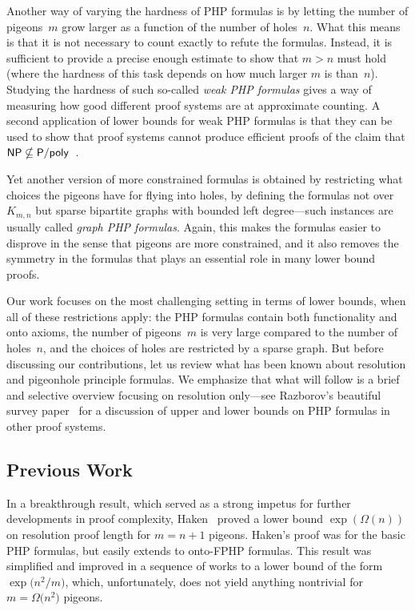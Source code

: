 \documentclass{article}
\newcommand{\Bigomega}[1]{\Omega \bigl( #1 \bigr)}
\newcommand{\bigomega}[1]{\Omega ( #1 )}
\newcommand{\complclassformat}[1]{\textrm{\upshape{\textsf{#1}}}\xspace}
\newcommand{\NP}{\complclassformat{NP}}
\newcommand{\Ppoly}{\complclassformat{P/poly}}
\newcommand{\introduceterm}[1]{{\emph{#1}}}
\newcommand{\squeezesubsection}[1]{\subsection{#1}}
\numberwithin{equation}{section}
\begin{document}
Another way of varying the hardness of PHP formulas is  by letting the
number of pigeons~$m$ grow larger as a function of the number of
holes~$n$.  
What this means is that it is not necessary to
count exactly to refute the formulas. Instead, it is sufficient 
to provide
a precise enough estimate 
to show that $m>n$
must hold (where the hardness of this task depends on how much larger
$m$ is than~$n$).
Studying the hardness of such so-called
\introduceterm{weak PHP formulas}
gives a way of measuring how good different proof systems
are at approximate counting.
A second
application of  lower bounds
for weak PHP  formulas is that they  can be used to show that proof
systems cannot produce efficient proofs of the claim that
\mbox{$\NP \nsubseteq \Ppoly$
\cite{Razborov98LowerBound,Razborov04ResolutionLowerBoundsPM}.}

Yet another version of more constrained formulas is obtained by
restricting what choices the pigeons have for flying into holes, by
defining the formulas not over~$K_{m,n}$ but
sparse bipartite
graphs with bounded left degree---such instances are usually called
\introduceterm{graph PHP formulas}.
Again, this makes the formulas easier to disprove in the sense that
pigeons are more constrained, and it also removes the symmetry in the
formulas that plays an essential role in many lower bound proofs.

Our work focuses on the most challenging setting in terms of lower
bounds, when all of these restrictions apply: 
the PHP formulas contain both functionality and onto axioms,
the number of  pigeons~$m$ is very large
compared to the number of holes~$n$,  
and the choices of holes are restricted by a sparse graph. 
But before discussing our contributions, let us review what has been
known about resolution and pigeonhole principle formulas.
We emphasize that what will follow is a brief and selective overview
focusing on resolution only---see Razborov's beautiful survey
paper~\cite{Razborov02ProofComplexityPHP} 
for a discussion of upper and lower bounds on PHP formulas in other
proof systems.



\squeezesubsection{Previous Work}
   
In a breakthrough result, which
served as a strong impetus for further developments in proof complexity,
Haken~\cite{Haken85Intractability} proved a lower bound
$\exp ( \bigomega{n}) $
on resolution proof length for $m=n+1$ pigeons.
Haken's proof was for the basic PHP formulas, but easily extends to
onto-FPHP formulas. 
This result was simplified and improved in a sequence of works
\cite{BP96Simplified,BW01ShortProofs,BT88ResolutionProofs,Urq03}
to a lower bound of the form
$\exp \bigl( n^2 / m \bigr)$,
which, unfortunately, does not yield anything nontrivial for 
$m = \Bigomega{n^2}$ pigeons.
\end{document}
